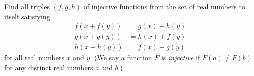 Find all triples $(f,g,h)$ of injective functions from the set of real numbers to itself satisfying
\begin{align*}
  f(x+f(y)) &= g(x) + h(y) \\
  g(x+g(y)) &= h(x) + f(y) \\
  h(x+h(y)) &= f(x) + g(y) 
\end{align*}
for all real numbers $x$ and $y$. (We say a function $F$ is \textit{injective} if $F(a)\neq F(b)$ for any distinct real numbers $a$ and $b$.)

